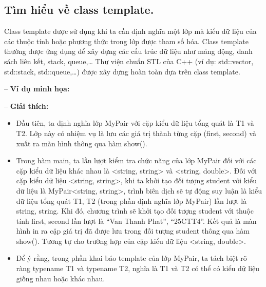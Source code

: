 \subsection{Tìm hiểu về class template.}
Class template được sử dụng khi ta cần định nghĩa một lớp mà kiểu dữ liệu của các thuộc tính hoặc phương thức trong lớp được tham số hóa.
Class template thường được ứng dụng để xây dựng các cấu trúc dữ liệu như mảng động, danh sách liên kết, stack, queue,\dots
Thư viện chuẩn STL của C++ (ví dụ: std::vector, std::stack, std::queue,\dots) được xây dựng hoàn toàn dựa trên class template.

-- \textbf{Ví dụ minh họa:}


-- \textbf{Giải thích:}
\begin{itemize}
    \item[$+$] Đầu tiên, ta định nghĩa lớp MyPair với cặp kiểu dữ liệu tổng quát là T1 và T2. 
               Lớp này có nhiệm vụ là lưu các giá trị thành từng cặp (first, second) và xuất ra màn hình thông qua hàm show().
    \item[$+$] Trong hàm main, ta lần lượt kiểm tra chức năng của lớp MyPair đối với các cặp kiểu dữ liệu khác nhau là <string, string> và <string, double>. 
               Đối với cặp kiểu dữ liệu <string, string>, khi ta khởi tạo đối tượng student với kiểu dữ liệu là MyPair<string, string>, 
               trình biên dịch sẽ tự động suy luận là kiểu dữ liệu tổng quát T1, T2 (trong phần định nghĩa lớp MyPair) lần lượt là string, string. 
               Khi đó, chương trình sẽ khởi tạo đối tượng student với thuộc tính first, second lần lượt là “Van Thanh Phat”, “25CTT4”. 
               Kết quả là màn hình in ra cặp giá trị đã được lưu trong đối tượng student thông qua hàm show(). 
               Tương tự cho trường hợp của cặp kiểu dữ liệu <string, double>.
    \item[$+$] Để ý rằng, trong phần khai báo template của lớp MyPair, ta tách biệt rõ ràng typename T1 và typename T2, 
               nghĩa là T1 và T2 có thể có kiểu dữ liệu giống nhau hoặc khác nhau.
\end{itemize}

